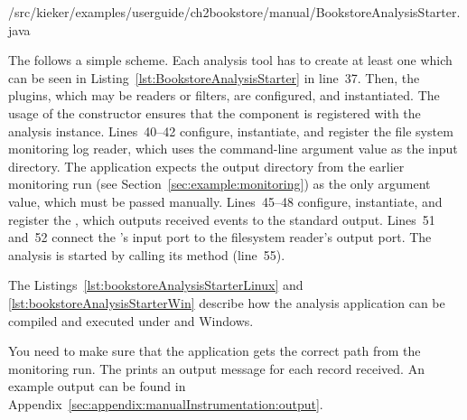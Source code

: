 
\setJavaCodeListing
%
{\manualInstrumentedBookstoreApplicationDir/src/kieker/examples/userguide/ch2bookstore/manual/BookstoreAnalysisStarter.java}


\noindent The  follows a simple scheme. Each %
analysis tool has to create at least one  which can be %
seen in Listing~\ref{lst:BookstoreAnalysisStarter} in line~37. Then, the plugins, %
which may be readers or filters, are configured, and instantiated. The usage of the  %
constructor ensures that the component is registered with the analysis instance. %
Lines~40--42 configure, instantiate, and register the file system monitoring %
log reader, which uses the command-line argument value as the input directory. %
The application expects the %
output directory from the earlier monitoring run (see Section~\ref{sec:example:monitoring}) %
as the only argument value, which must be passed manually. %
Lines~45--48 configure, instantiate, and register the , %
which outputs received events to the standard output. Lines~51 and~52 connect %
the 's input port to the filesystem reader's output port. %
The analysis is started by calling its  method (line~55). %


The Listings~\ref{lst:bookstoreAnalysisStarterLinux} and \ref{lst:bookstoreAnalysisStarterWin} %
describe how the analysis application can be compiled and executed under \UnixLikeSystems{} and Windows.

\setBashListing
\enlargethispage{1.0cm}




\noindent You need to make sure that the application gets the correct path from the monitoring run.
The  prints an output message for each record received. %
An example output can be found in Appendix~\ref{sec:appendix:manualInstrumentation:output}.
